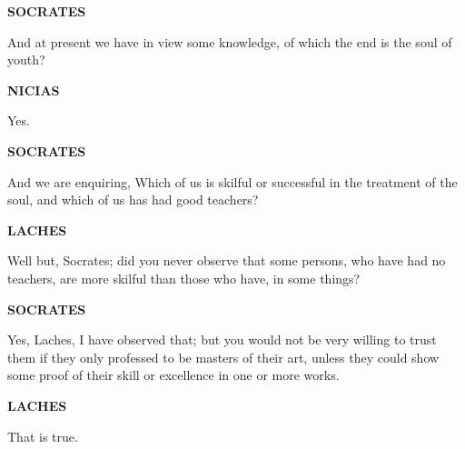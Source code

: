 \documentclass[11pt,letter]{book}
\begin{document}
\par \textbf{SOCRATES}
\par   And at present we have in view some knowledge, of which the end is the soul of youth?

\par \textbf{NICIAS}
\par   Yes.

\par \textbf{SOCRATES}
\par   And we are enquiring, Which of us is skilful or successful in the treatment of the soul, and which of us has had good teachers?

\par \textbf{LACHES}
\par   Well but, Socrates; did you never observe that some persons, who have had no teachers, are more skilful than those who have, in some things?

\par \textbf{SOCRATES}
\par   Yes, Laches, I have observed that; but you would not be very willing to trust them if they only professed to be masters of their art, unless they could show some proof of their skill or excellence in one or more works.

\par \textbf{LACHES}
\par   That is true.
\end{document}
